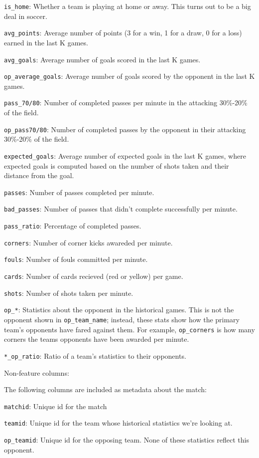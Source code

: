 \documentclass[12pt,fleqn]{article}\usepackage{common}
\begin{document}
\verb!is_home!: Whether a team is playing at home or away. This turns out
to be a big deal in soccer.

\verb!avg_points!: Average number of points (3 for a win, 1 for a draw, 0
for a loss) earned in the last K games.

\verb!avg_goals!: Average number of goals scored in the last K games.

\verb!op_average_goals!: Average number of goals scored by the opponent in the last K games.

\verb!pass_70/80!: Number of completed passes per minute in the attacking
30\%-20\% of the field.

\verb!op_pass70/80!: Number of completed passes by the opponent in their
attacking 30\%-20\% of the field.

\verb!expected_goals!: Average number of expected goals in the last K
games, where expected goals is computed based on the number of shots taken
and their distance from the goal.

\verb!passes!: Number of passes completed per minute.

\verb!bad_passes!: Number of passes that didn't complete successfully per
minute.

\verb!pass_ratio!: Percentage of completed passes.

\verb!corners!: Number of corner kicks awareded per minute.

\verb!fouls!: Number of fouls committed per minute.

\verb!cards!: Number of cards recieved (red or yellow) per game.

\verb!shots!: Number of shots taken per minute.

\verb!op_*!: Statistics about the opponent in the historical games. This is
not the opponent shown in \verb!op_team_name!; instead, these stats show
how the primary team's opponents have fared against them. For example,
\verb!op_corners! is how many corners the teams opponents have been awarded
per minute.

\verb!*_op_ratio!: Ratio of a team's statistics to their opponents.

Non-feature columns:

The following columns are included as metadata about the match:

\verb!matchid!: Unique id for the match

\verb!teamid!: Unique id for the team whose historical statistics we're looking at.

\verb!op_teamid!: Unique id for the opposing team. None of these statistics
reflect this opponent.
\end{document}
